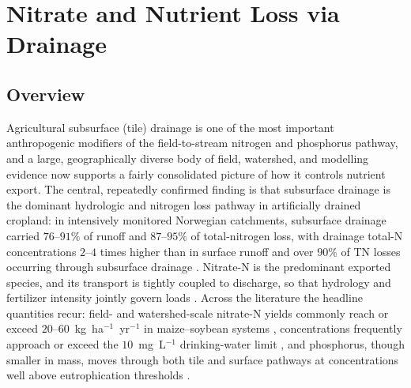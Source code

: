\documentclass[11pt]{article}
\begin{document}
\section*{Nitrate and Nutrient Loss via Drainage}

\subsection{Overview}

Agricultural subsurface (tile) drainage is one of the most important
anthropogenic modifiers of the field-to-stream nitrogen and phosphorus
pathway, and a large, geographically diverse body of field, watershed,
and modelling evidence now supports a fairly consolidated picture of how
it controls nutrient export. The central, repeatedly confirmed finding
is that subsurface drainage is the dominant hydrologic and nitrogen loss
pathway in artificially drained cropland: in intensively monitored
Norwegian catchments, subsurface drainage carried $76$--$91\%$ of runoff
and $87$--$95\%$ of total-nitrogen loss, with drainage total-N
concentrations $2$--$4$ times higher than in surface runoff and over
$90\%$ of TN losses occurring through subsurface drainage
\parencite{Bechmann2014}. Nitrate-N is the predominant exported species,
and its transport is tightly coupled to discharge, so that hydrology and
fertilizer intensity jointly govern loads \parencite{Raymond2012}. Across
the literature the headline quantities recur: field- and watershed-scale
nitrate-N yields commonly reach or exceed $20$--$60$~kg~ha$^{-1}$~yr$^{-1}$
in maize--soybean systems \parencite{Gentry2009,Gentry2014,Dattamudi2020,Tomer2008},
concentrations frequently approach or exceed the $10$~mg~L$^{-1}$
drinking-water limit \parencite{Dattamudi2020,Gordon2021}, and phosphorus,
though smaller in mass, moves through both tile and surface pathways at
concentrations well above eutrophication thresholds \parencite{Smith2008,Tomer2008}.
\end{document}

